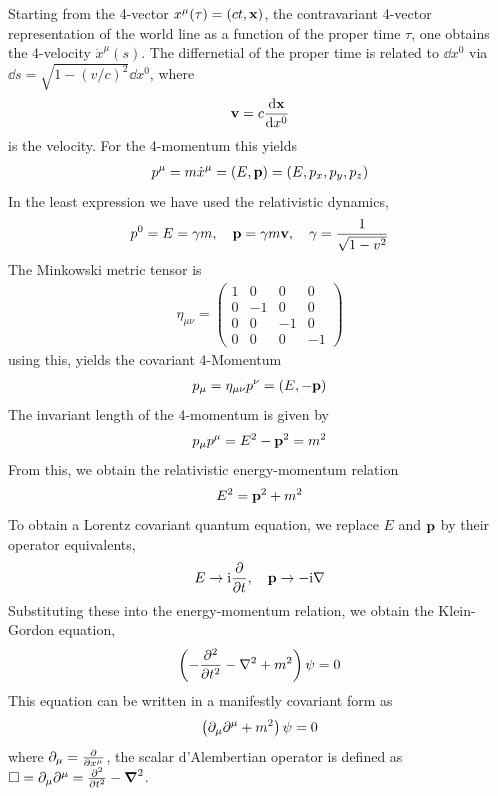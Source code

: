 Starting from the 4-vector $x^ \mu (\tau) = (ct,\mathbf{x})$, the contravariant 4-vector representation of the world line as a function of the proper time $\tau$, one obtains the 4-velocity $\dot{x}^\mu(s)$. The differnetial of the proper time is related to $\dd x^0$ via $\dd s = \sqrt{1-(v/c)^2} \dd x^0$, where 
\begin{align}
    \mathbf{v} = c \frac{\mathrm{d} \mathbf{x}}{\mathrm{d} x^0}
\end{align}
is the velocity. For the 4-momentum this yields 
\begin{align}
    p^ \mu = m \dot{x}^\mu = \left( E, \mathbf{p} \right) = \left(E,p_x,p_y,p_z\right)
\end{align}
In the least expression we have used the relativistic dynamics, 
\begin{align}
    p^0 = E = \gamma m , \quad \mathbf{p} = \gamma m \mathbf{v}, \quad \gamma = \frac{1}{\sqrt{1-v^2}}
\end{align}
The Minkowski metric tensor is 
\begin{align}
    \eta_{\mu \nu} = \begin{pmatrix}
        1 & 0 & 0 & 0 \\
        0 & -1 & 0 & 0 \\
        0 & 0 & -1 & 0 \\
        0 & 0 & 0 & -1
    \end{pmatrix}
\end{align}
using this, yields the covariant 4-Momentum
\begin{align}
    p_ \mu = \eta_{\mu \nu} p^ \nu = \left(E,-\mathbf{p}\right)
\end{align}
The invariant length of the 4-momentum is given by
\begin{align}
    p_ \mu p^ \mu = E^2 - \mathbf{p}^2 = m^2 \label{eq:4-momentum_invariant}
\end{align}
From this, we obtain the relativistic energy-momentum relation
\begin{align}
    E^2 = \mathbf{p}^2 + m^2
\end{align}
To obtain a Lorentz covariant quantum equation, we replace $E$ and $\mathbf{p}$ by their operator equivalents,
\begin{align}
    E \to \mathrm{i} \frac{\partial }{\partial t}, \quad \mathbf{p} \to -\mathrm{i} \nabla
\end{align}
Substituting these into the energy-momentum relation, we obtain the Klein-Gordon equation,
\begin{align}
    \left( -\frac{\partial ^2}{\partial t^2} - \nabla^2 + m^2 \right) \psi  = 0
\end{align}
This equation can be written in a manifestly covariant form as
\begin{align}
    \left( \partial_\mu \partial^\mu + m^2 \right) \psi = 0 \label{eq:Klein_Gordon_equation}
\end{align}
where $\partial_ \mu = \frac{\partial }{\partial x^ \mu}$, the scalar d'Alembertian operator is defined as $\boldsymbol{\Box} = \partial_ \mu \partial^ \mu = \frac{\partial ^2}{\partial t^2} - \boldsymbol{\nabla}^2$.


